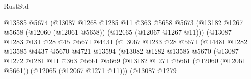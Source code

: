 \begin{lexlean}{RustStd}
\begin{coremodule}
                                      @13585
                                      @5674
                                      (@13087
                                        @1268
                                        @1285
                                        @11
                                        @363
                                        @5658
                                        @5673
                                        (@13182
                                          @1267
                                          @5658
                                          (@12060 (@12061 @5658))
                                          (@12065 (@12067 @1267 @11)))
                                        (@13087
                                          @1283
                                          @131
                                          @28
                                          @45
                                          @5671
                                          @4431
                                          (@13067
                                            @1283
                                            @28
                                            @5671
                                            (@14481
                                              @1282
                                              @13585
                                              @4437
                                              @5670
                                              @4721
                                              @13594
                                              (@13082
                                                @1282
                                                @13585
                                                @5670
                                                (@13087
                                                  @1272
                                                  @1281
                                                  @11
                                                  @363
                                                  @5661
                                                  @5669
                                                  (@13182
                                                    @1271
                                                    @5661
                                                    (@12060 (@12061 @5661))
                                                    (@12065 (@12067 @1271 @11)))
                                                  (@13087
                                                    @1279

\end{coremodule}
\end{lexlean}
